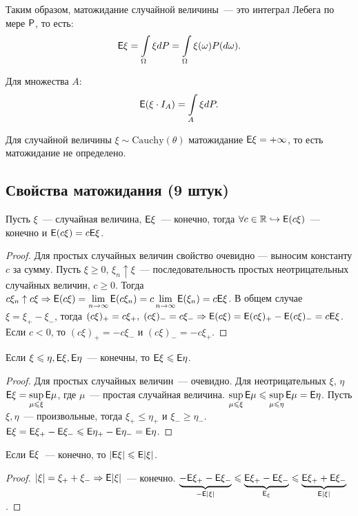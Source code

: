 \begin{statement}
    Таким образом, матожидание случайной величины~--- это интеграл Лебега по мере $\P$, то есть: $$ \E\xi = \int\limits_\Omega \xi dP = \int\limits_\Omega \xi(\omega)P(d\omega).$$

    Для множества $A$:
    $$ \E(\xi\cdot I_A) = \int\limits_A \xi dP. $$
\end{statement}

    Для случайной величины $\xi \sim \text{Cauchy}(\theta)$ матожидание $\E\xi = +\infty$, то есть матожидание не определено.

\subsection{Свойства матожидания (9 штук)}
\begin{property}
	Пусть $\xi$~--- случайная величина, $\E \xi$~--- конечно, тогда $\forall c \in \R \hookrightarrow \E(c\xi)$~--- конечно и $\E(c\xi) = c\E\xi$.
	\begin{proof}
		Для простых случайных величин свойство очевидно --- выносим константу $c$ за сумму. Пусть $\xi \geqslant 0$, $\xi_n \uparrow \xi$~--- последовательность простых неотрицательных случайных величин, $c \geqslant 0$. Тогда $c\xi_n \uparrow c\xi \Rightarrow \E(c\xi) = \lim\limits_{n \rightarrow \infty} \E(c\xi_n) = c \lim\limits_{n \rightarrow \infty} \E(\xi_n) = c\E\xi$. В общем случае $\xi = \xi_+ - \xi_-$, тогда $(c\xi)_+ = c\xi_+,\; (c\xi)_- = c\xi_- \Rightarrow \E(c\xi) = \E(c\xi)_+ - \E(c\xi)_- = c\E\xi$. Если $c < 0$, то $(c\xi)_+ = -c\xi_-$ и $(c\xi)_- = -c\xi_+$.
	\end{proof}
\end{property}

\begin{property}
	Если $\xi \leqslant \eta, \E \xi, \E \eta$~--- конечны, то $\E \xi \leqslant \E \eta$.
	\begin{proof}
		Для простых случайных величин~--- очевидно. Для неотрицательных $\xi$, $\eta$ $\E\xi = \sup\limits_{\mu \leqslant \xi}\E\mu$, где $\mu$~--- простая случайная величина. $\sup\limits_{\mu \leqslant \xi}\E\mu \leqslant \sup\limits_{\mu \leqslant \eta}\E\mu = \E\eta$. Пусть $\xi, \eta$~--- произвольные, тогда $\xi_+ \leqslant \eta_+$ и $\xi_- \geqslant \eta_-$. $\E\xi = \E\xi_+ - \E\xi_- \leqslant \E\eta_+ - \E\eta_- = \E\eta$.
	\end{proof}
\end{property}
\begin{property}
	Если $\E\xi$~--- конечно, то $|\E\xi| \leqslant \E|\xi|$.
	\begin{proof}
		$|\xi| = \xi_+ + \xi_- \Rightarrow \E|\xi|$~--- конечно. $\underbrace{-\E\xi_+ - \E\xi_-}_{-\E|\xi|} \leqslant \underbrace{\E\xi_+ - \E\xi_-}_{\E_\xi} \leqslant \underbrace{\E\xi_+ + \E\xi_-}_{\E|\xi|}$.
	\end{proof}
\end{property}

